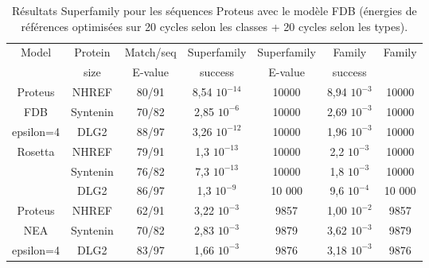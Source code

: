 \begin{table}[h]
  \raggedleft{}
  
  \begin{tabular}{ccccccc}
    
    \toprule
    Model &Protein & Match/seq & Superfamily & Superfamily & Family & Family \\
            & size      & E-value      & success     & E-value & success\\
    \cmidrule{1-7}
    Proteus                   & NHREF     & 80/91  &  8,54 $10^{-14}$  & 10000  & 8,94 $10^{-3}$ & 10000 \\
    FDB                       & Syntenin  & 70/82  &  2,85 $10^{-6}$   & 10000  & 2,69 $10^{-3}$ & 10000 \\
    epsilon=4                 & DLG2      & 88/97  &  3,26 $10^{-12}$  & 10000  & 1,96 $10^{-3}$ & 10000 \\
    \cmidrule{1-7}
    \multirow{3}{*}{Rosetta}  & NHREF     & 79/91  &  1,3 $10^{-13}$ & 10000    & 2,2 $10^{-3}$ & 10000 \\
                              & Syntenin  & 76/82  &  7,3 $10^{-13}$ & 10000    & 1,8 $10^{-3}$ & 10000 \\
                              & DLG2      & 86/97  &  1,3 $10^{-9}$  & 10 000    & 9,6 $10^{-4}$ & 10 000 \\    
    \cmidrule{1-7}
    Proteus                   & NHREF     & 62/91 &   3,22 $10^{-3}$  & 9857    & 1,00 $10^{-2}$ & 9857 \\
    NEA                       & Syntenin  & 70/82 &   2,83 $10^{-3}$  & 9879    & 3,62 $10^{-3}$ & 9879 \\
    epsilon=4                 & DLG2      & 83/97 &   1,66 $10^{-3}$  & 9876    & 3,18 $10^{-3}$ & 9876 \\ 
    \bottomrule        
  \end{tabular}   
  \caption{Résultats Superfamily pour les séquences Proteus avec le modèle FDB (énergies de références optimisées sur 20 cycles selon les classes + 20 cycles selon les types).}   
  \label{tab:superfamily3prot}       
\end{table}


